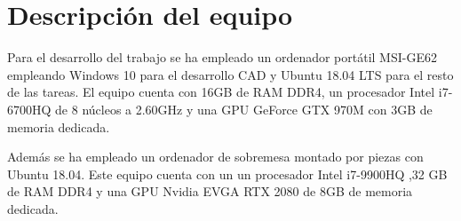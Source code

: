 \section{Descripción del equipo}
Para el desarrollo del trabajo se ha empleado un ordenador portátil MSI-GE62 empleando Windows 10 para el desarrollo CAD y Ubuntu 18.04 LTS para el resto de las tareas. El equipo cuenta con 16GB de RAM DDR4, un procesador Intel i7-6700HQ de 8 núcleos a 2.60GHz y una GPU GeForce GTX 970M con 3GB de memoria dedicada.

Además se ha empleado un ordenador de sobremesa montado por piezas con Ubuntu 18.04. Este equipo cuenta con un un procesador Intel i7-9900HQ ,32 GB de RAM DDR4 y una GPU Nvidia EVGA RTX 2080 de 8GB de memoria dedicada. 

